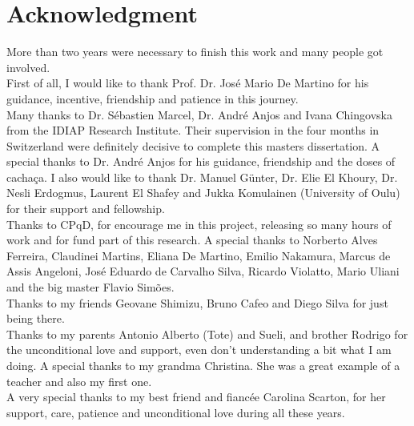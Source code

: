 \chapter*{Acknowledgment}


\noindent More than two years were necessary to finish this work and many people got involved. \\

First of all, I would like to thank Prof. Dr. Jos\'e Mario De Martino for his guidance, incentive, friendship and patience in this journey. \\

Many thanks to Dr. S\'ebastien Marcel, Dr. Andr\'e Anjos and Ivana Chingovska from the IDIAP Research Institute. Their supervision in the four months in Switzerland were definitely decisive to complete this masters dissertation. A special thanks to Dr. Andr\'e Anjos for his guidance, friendship and the doses of cacha\c{c}a. I also would like to thank Dr. Manuel G{\"u}nter, Dr. Elie El Khoury, Dr. Nesli Erdogmus, Laurent El Shafey and Jukka Komulainen (University of Oulu) for their support and fellowship. \\

Thanks to CPqD, for encourage me in this project, releasing so many hours of work and for fund part of this research. A special thanks to Norberto Alves Ferreira, Claudinei Martins, Eliana De Martino, Emilio Nakamura, Marcus de Assis Angeloni, Jos\'e Eduardo de Carvalho Silva, Ricardo Violatto, Mario Uliani and the big master Flavio Sim\~oes. \\

Thanks to my friends Geovane Shimizu, Bruno Cafeo and Diego Silva for just being there. \\

Thanks to my parents Antonio Alberto (Tote) and Sueli, and brother Rodrigo for the unconditional love and support, even don't understanding a bit what I am doing. A special thanks to my grandma Christina. She was a great example of a teacher and also my first one. \\

A very special thanks to my best friend and fianc\'ee Carolina Scarton, for her support, care, patience and unconditional love during all these years.


\newpage %

\null

